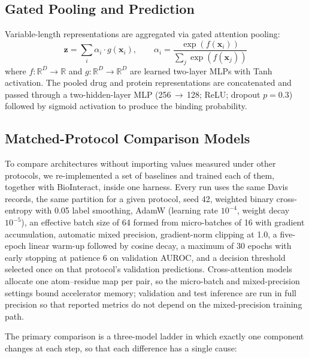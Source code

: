 \documentclass[fleqn,10pt]{wlscirep}
\begin{document}
\subsection{Gated Pooling and Prediction}

Variable-length representations are aggregated via gated attention pooling:
\begin{equation}
\mathbf{z} = \sum_{i}\alpha_i\cdot g(\mathbf{x}_i),\qquad
\alpha_i = \frac{\exp(f(\mathbf{x}_i))}{\sum_j\exp(f(\mathbf{x}_j))}
\end{equation}
where $f\colon\mathbb{R}^D\to\mathbb{R}$ and
$g\colon\mathbb{R}^D\to\mathbb{R}^D$ are learned two-layer MLPs with Tanh
activation.  The pooled drug and protein representations are concatenated and
passed through a two-hidden-layer MLP (256\,$\to$\,128; ReLU; dropout $p=0.3$)
followed by sigmoid activation to produce the binding probability.

\subsection{Matched-Protocol Comparison Models}
\label{sec:matched_methods}

To compare architectures without importing values measured under other
protocols, we re-implemented a set of baselines and trained each of them,
together with BioInteract, inside one harness.  Every run uses the same Davis records,
the same partition for a given protocol, seed 42, weighted binary cross-entropy
with 0.05 label smoothing, AdamW (learning rate $10^{-4}$, weight decay
$10^{-5}$), an effective batch size of 64 formed from micro-batches of 16 with
gradient accumulation, automatic mixed precision, gradient-norm clipping at 1.0,
a five-epoch linear warm-up followed by cosine decay, a maximum of 30 epochs
with early stopping at patience 6 on validation AUROC, and a decision threshold
selected once on that protocol's validation predictions.  Cross-attention
models allocate one atom--residue map per pair, so the micro-batch and
mixed-precision settings bound accelerator memory; validation and test
inference are run in full precision so that reported metrics do not depend on
the mixed-precision training path.

The primary comparison is a three-model ladder in which exactly one component
changes at each step, so that each difference has a single cause:
\end{document}
